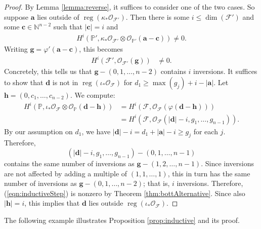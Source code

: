 \documentclass[12pt,reqno]{amsart}
\theoremstyle{definition}
\theoremstyle{remark}
\newcommand{\reg}{\operatorname{reg}}
\newcommand{\calF}{{\mathcal{F}}}
\newcommand{\calO}{{\mathcal{O}}}
\begin{document}
\begin{proof}
    By Lemma \ref{lemma:reverse}, it suffices to consider one of the two cases.  So suppose $\mathbf{a}$ lies outside of $\reg(\kappa_*\calO_{\calF'})$.  Then there is some $i \leq \dim(\calF')$ and some $\mathbf{c} \in \mathbb N^{n-2}$ such that $|\mathbf{c}| = i$ and 
    \begin{align*}
        H^i(\mathbb P', \kappa_*\calO_{\calF'}\otimes \calO_{\mathbb P'}(\mathbf a - \mathbf c)) \neq 0.
    \end{align*}
    Writing $\mathbf{g} = \varphi'(\mathbf a - \mathbf c)$, this becomes 
    \begin{align*}
        H^i(\calF', \calO_{\calF'}(\mathbf{g}))&\neq 0.
        \end{align*}
    Concretely, this tells us that $\mathbf g - (0,1,\ldots,n-2)$ contains $i$ inversions.  It suffices to show that $\mathbf{d}$ is not in $\reg(\iota_*\calO_{\calF})$ for $d_1 \geq \max(g_j)+i-|\mathbf{a}|$.  Let $\mathbf h = (0,c_1,\ldots,c_{n-2})$.  We compute:
    \begin{align}
        H^i(\mathbb P, \iota_*\calO_{\calF}\otimes \calO_{\mathbb P}(\mathbf d - \mathbf h)) &= H^i(\calF, \calO_{\calF}(\varphi(\mathbf d - \mathbf h)))\nonumber\\
        &=H^i(\calF, \calO_{\calF}(\lvert \mathbf d \rvert - i, g_1,\ldots,g_{n-1})). \label{eqn:inductiveStep}
    \end{align}
    By our assumption on $d_1$, we have $|\mathbf{d}|-i = d_1 + |\mathbf{a}|-i \geq g_j$ for each $j$.  Therefore, 
    \[
    (|\mathbf{d}|-i,g_1,\ldots,g_{n-1}) - (0,1,\ldots,n-1)
    \]
    contains the same number of inversions as  $\mathbf g - (1,2,\ldots,n-1)$.  Since inversions are not affected by adding a multiple of $(1,1,\ldots,1)$, this in turn has the same number of inversions as $\mathbf g - (0,1,\ldots,n-2)$; that is, $i$ inversions.  Therefore, (\ref{eqn:inductiveStep}) is nonzero by Theorem \ref{thm:bottAlternative}. Since also $|\mathbf{h}| = i$, this implies that $\mathbf d$ lies outside $\reg(\iota_*\calO_{\calF})$.
\end{proof}

The following example illustrates Proposition \ref{prop:inductive} and its proof.
\end{document}

